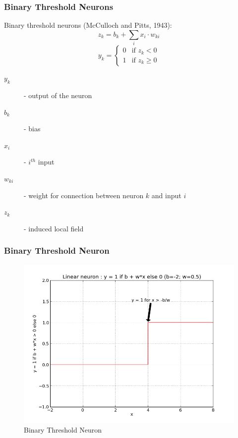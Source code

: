 \begin{frame}
  \frametitle{Binary Threshold Neurons}
  \begin{definition}
    \alert{Binary threshold neurons (McCulloch and Pitts, 1943)}:
    \begin{equation}
      \label{eq:binary-threshold-neuron-1}
      z_k = b_k + \displaystyle\sum_{i}x_i\cdot w_{ki}
    \end{equation}
    \begin{equation}
      \label{eq:binary-threshold-neuron-2}
      y_k = \begin{cases} 0 & \text{if } z_k < 0 \\ 1 & \text{if } z_k \ge 0 \end{cases}
    \end{equation}
    \begin{description}
    \item[$y_k$] - output of the neuron
    \item[$b_k$] - bias
    \item[$x_i$] - $i^{th}$ input
    \item[$w_{ki}$] - weight for connection between neuron $k$ and input $i$
    \item[$z_k$] - induced local field
    \end{description}
  \end{definition}
\end{frame}

\begin{frame}
  \frametitle{Binary Threshold Neuron}
  \begin{figure}[h!]
    \centering
    \includegraphics[height = .7\textheight]{graphics/binary_threshold_neuron.png}
    \caption{Binary Threshold Neuron}
  \end{figure}
\end{frame}

